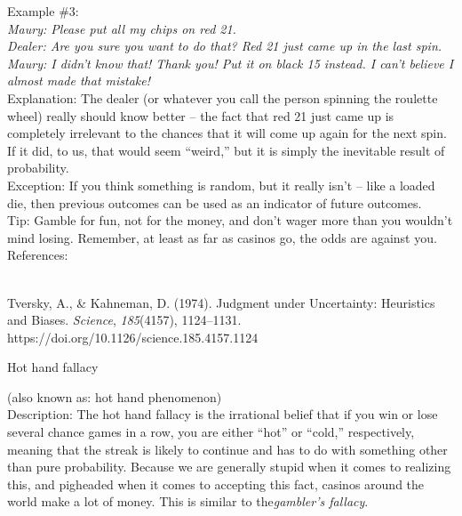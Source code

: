 \documentclass[a4paper,12pt,single,pdftex]{scrbook}
\begin{document}
{    
      Example \#3:
    \\

    
      {\em Maury: Please put all my chips on red 21.}
    \\

    
      {\em Dealer: Are you sure you want to do that?  Red 21 just came up in the last spin.}
    \\

    
      {\em Maury:  I didn’t know that!  Thank you!  Put it on black 15 instead.  I can’t believe I almost made that mistake!}
    \\

    
      Explanation: The dealer (or whatever you call the person spinning the roulette wheel) really should know better -- the fact that red 21 just came up is completely irrelevant to the chances that it will come up again for the next spin.  If it did, to us, that would seem “weird,” but it is simply the inevitable result of probability.
    \\

    
      Exception: If you think something is random, but it really isn’t -- like a loaded die, then previous outcomes can be used as an indicator of future outcomes.
    \\

    
      Tip: Gamble for fun, not for the money, and don’t wager more than you wouldn’t mind losing.  Remember, at least as far as casinos go, the odds are against you.
    \\

    References:

    
      
        
      \\

      
        
          Tversky, A., \& Kahneman, D. (1974). Judgment under Uncertainty: Heuristics and Biases. {\it Science}, {\it 185}(4157), 1124–1131. https://doi.org/10.1126/science.185.4157.1124
        
      
    
  }


Hot hand fallacy
    
      (also known as: hot hand phenomenon)
    \\

  
    
      Description: The hot hand fallacy is the irrational belief that if you win or lose several chance games in a row, you are either “hot” or “cold,” respectively, meaning that the streak is likely to continue and has to do with something other than pure probability.  Because we are generally stupid when it comes to realizing this, and pigheaded when it comes to accepting this fact, casinos around the world make a lot of money. This is similar to the{\it  gambler’s fallacy}.
    \\
\end{document}
